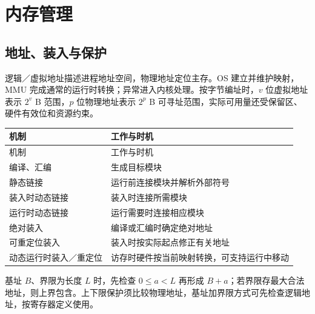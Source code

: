 \chapter{内存管理}\label{OS03}

\section{地址、装入与保护}\label{OS03-addresses}

逻辑／虚拟地址描述进程地址空间，物理地址定位主存。OS 建立并维护映射，MMU 完成通常的运行时转换；异常进入内核处理。按字节编址时，\(v\) 位虚拟地址表示 \(2^v\) B 范围，\(p\) 位物理地址表示 \(2^p\) B 可寻址范围，实际可用量还受保留区、硬件有效位和资源约束。

\par\smallskip
{\fontsize{9.3}{12}\selectfont\setlength{\tabcolsep}{2.5pt}\setlength{\LTleft}{0pt}\setlength{\LTright}{0pt}
\begin{longtable}{@{}>{\raggedright\arraybackslash}p{}>{\raggedright\arraybackslash}p{}@{}}
\toprule
机制 & 工作与时机 \\

\midrule\endfirsthead\toprule
机制 & 工作与时机 \\

\midrule\endhead\bottomrule\endfoot
编译、汇编 & 生成目标模块 \\

静态链接 & 运行前连接模块并解析外部符号 \\

装入时动态链接 & 装入时连接所需模块 \\

运行时动态链接 & 运行需要时连接相应模块 \\

绝对装入 & 编译或汇编时确定绝对地址 \\

可重定位装入 & 装入时按实际起点修正有关地址 \\

动态运行时装入／重定位 & 访存时硬件按当前映射转换，可支持运行中移动 \\

\end{longtable}}
\par\smallskip

基址 \(B\)、界限为长度 \(L\) 时，先检查 \(0\le a<L\) 再形成 \(B+a\)；若界限存最大合法地址，则上界包含。上下限保护须比较物理地址，基址加界限方式可先检查逻辑地址，按寄存器定义使用。


